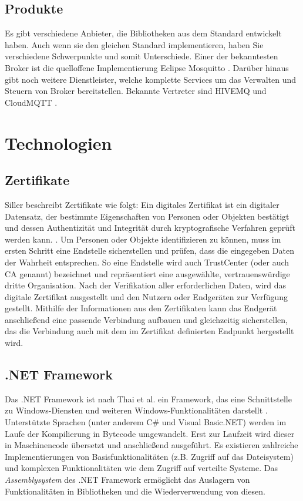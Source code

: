     \subsection{Produkte}
        Es gibt verschiedene Anbieter, die Bibliotheken aus dem Standard entwickelt haben. Auch wenn sie den gleichen Standard implementieren, haben Sie verschiedene Schwerpunkte und somit Unterschiede. Einer der bekanntesten Broker ist die quelloffene Implementierung Eclipse Mosquitto \cite{eclipse_foundation_inc_2018}. Darüber hinaus gibt noch weitere Dienstleister, welche komplette Services um das Verwalten und Steuern von Broker bereitstellen. Bekannte Vertreter sind HIVEMQ \cite{hivemq_dc_square_gmbh} und CloudMQTT \cite{84codes_ab_2019}.

\section{Technologien} \label{Technologien}
        \subsection{Zertifikate}
        Siller beschreibt Zertifikate wie folgt:
        \glqq Ein digitales Zertifikat ist ein digitaler Datensatz, der bestimmte Eigenschaften von Personen oder Objekten bestätigt und dessen Authentizität und Integrität durch kryptografische Verfahren geprüft werden kann.\grqq{} \cite{siller_2018}.
        Um Personen oder Objekte identifizieren zu können, muss im ersten Schritt eine Endstelle sicherstellen und prüfen, dass die eingegeben Daten der Wahrheit entsprechen. So eine Endstelle wird auch TrustCenter (oder auch \glqq \ac{CA}\grqq{} genannt) bezeichnet und repräsentiert eine ausgewählte, vertrauenswürdige dritte Organisation. Nach der Verifikation aller erforderlichen Daten, wird das digitale Zertifikat ausgestellt und den Nutzern oder Endgeräten zur Verfügung gestellt. Mithilfe der Informationen aus den Zertifikaten kann das Endgerät anschließend eine passende Verbindung aufbauen und gleichzeitig sicherstellen, das die Verbindung auch mit dem im Zertifikat definierten Endpunkt hergestellt wird.
    
    \subsection{.NET Framework}
        Das .NET Framework ist nach Thai et al. ein Framework, das eine Schnittstelle zu Windows-Diensten und weiteren Windows-Funktionalitäten darstellt \cite{thai2003net}.
        Unterstützte Sprachen (unter anderem C\# und Visual Basic.NET) werden im Laufe der Kompilierung in Bytecode umgewandelt. Erst zur Laufzeit wird dieser in Maschinencode übersetzt und anschließend ausgeführt. Es existieren zahlreiche Implementierungen von Basisfunktionalitäten (z.B. Zugriff auf das Dateisystem) und komplexen Funktionalitäten wie dem Zugriff auf verteilte Systeme. 
        Das \emph{Assemblysystem} des .NET Framework ermöglicht das Auslagern von Funktionalitäten in Bibliotheken und die Wiederverwendung von diesen.
        
